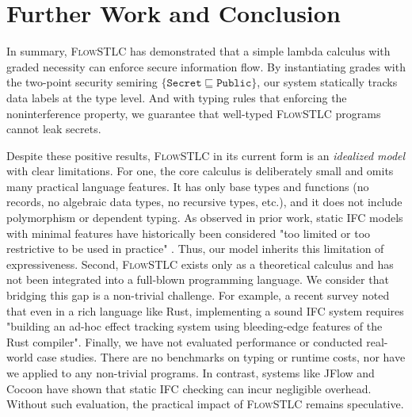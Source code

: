 \documentclass[conference]{IEEEtran}
\newcommand\public{\texttt{Public}}
\newcommand\secret{\texttt{Secret}}
\begin{document}
\section{Further Work and Conclusion}

In summary, \textsc{FlowSTLC} has demonstrated that a simple lambda calculus with graded necessity can enforce secure information flow. By instantiating grades with the two-point security semiring $\{\secret\sqsubseteq\public\}$, our system statically tracks data labels at the type level. And with typing rules that enforcing the noninterference property, we guarantee that well-typed \textsc{FlowSTLC} programs cannot leak secrets. 

Despite these positive results, \textsc{FlowSTLC} in its current form is an \emph{idealized model} with clear limitations. For one, the core calculus is deliberately small and omits many practical language features. It has only base types and functions (no records, no algebraic data types, no recursive types, etc.), and it does not include polymorphism or dependent typing. As observed in prior work, static IFC models with minimal features have historically been considered "too limited or too restrictive to be used in practice" \cite{myers1999jflow}. Thus, our model inherits this limitation of expressiveness. Second, \textsc{FlowSTLC} exists only as a theoretical calculus and has not been integrated into a full-blown programming language. We consider that bridging this gap is a non-trivial challenge. For example, a recent survey noted that even in a rich language like Rust, implementing a sound IFC system requires "building an ad-hoc effect tracking system using bleeding-edge features of the Rust compiler". Finally, we have not evaluated performance or conducted real-world case studies. There are no benchmarks on typing or runtime costs, nor have we applied  to any non-trivial programs. In contrast, systems like JFlow and Cocoon \cite{lamba2024cocoon} have shown that static IFC checking can incur negligible overhead. Without such evaluation, the practical impact of \textsc{FlowSTLC} remains speculative.
\end{document}
